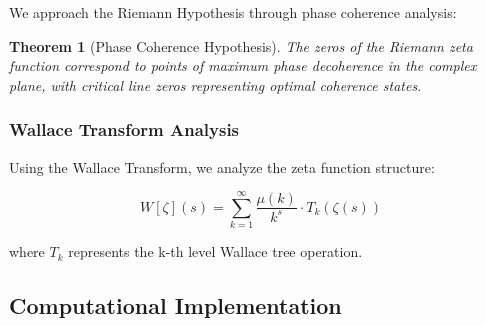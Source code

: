 \documentclass[12pt]{article}
\newtheorem{theorem}{Theorem}
\begin{document}
We approach the Riemann Hypothesis through phase coherence analysis:

\begin{theorem}[Phase Coherence Hypothesis]
The zeros of the Riemann zeta function correspond to points of maximum phase decoherence in the complex plane, with critical line zeros representing optimal coherence states.
\end{theorem}

\subsubsection{Wallace Transform Analysis}

Using the Wallace Transform, we analyze the zeta function structure:

\begin{equation}
W[\zeta](s) = \sum_{k=1}^{\infty} \frac{\mu(k)}{k^s} \cdot T_k(\zeta(s))
\end{equation}

where $T_k$ represents the k-th level Wallace tree operation.

\subsection{Computational Implementation}
\end{document}
